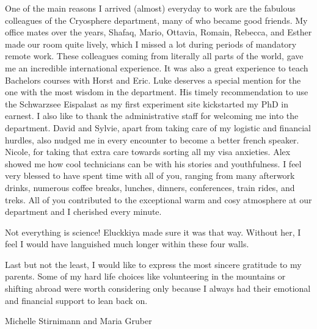 One of the main reasons I arrived (almost) everyday to work are the fabulous colleagues of the Cryosphere
department, many of who became good friends. My office mates over the years, Shafaq, Mario, Ottavia, Romain,
Rebecca, and Esther made our room quite lively, which I missed a lot during periods of mandatory remote work.
These colleagues coming from literally all parts of the world, gave me an incredible international experience.
It was also a great experience to teach Bachelors courses with Horst and Eric. Luke deserves a special mention
for the one with the most wisdom in the department. His timely recommendation to use the Schwarzsee Eispalast as
my first experiment site kickstarted my PhD in earnest. I also like to thank the administrative staff for
welcoming me into the department. David and Sylvie, apart from taking care of my logistic and financial hurdles,
also nudged me in every encounter to become a better french speaker. Nicole, for taking that extra care towards
sorting all my visa anxieties. Alex showed me how cool technicians can be with his stories and youthfulness. I
feel very blessed to have spent time with all of you, ranging from many afterwork drinks, numerous coffee
breaks, lunches, dinners, conferences, train rides, and treks. All of you contributed to the exceptional warm
and cosy atmosphere at our department and I cherished every minute. 

Not everything is science! Eluckkiya made sure it was that way. Without her, I feel I would have languished much
longer within these four walls.

Last but not the least, I would like to express the most sincere gratitude to my parents. Some of my hard life
choices like volunteering in the mountains or shifting abroad were worth considering only because I always had
their emotional and financial support to lean back on.

Michelle Stirnimann and Maria Gruber

